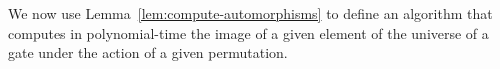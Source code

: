 \documentclass[../paper.tex]{subfiles}
\begin{document}



We now use Lemma~\ref{lem:compute-automorphisms} to define an algorithm that
computes in polynomial-time the image of a given element of the universe of a
gate under the action of a given permutation.
\end{document}
